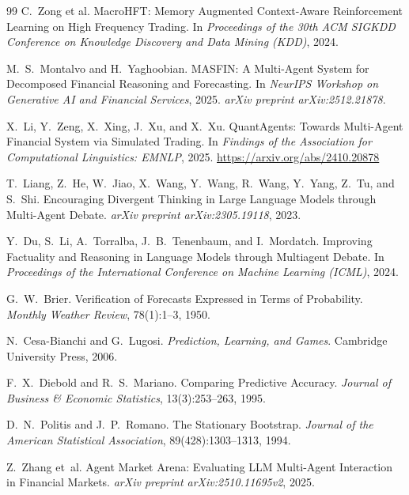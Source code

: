 \documentclass[10pt,a4paper,twocolumn]{article}
\begin{document}
\begin{thebibliography}{99}
C.~Zong et al.
\newblock MacroHFT: Memory Augmented Context-Aware Reinforcement Learning on High Frequency Trading.
\newblock In \emph{Proceedings of the 30th ACM SIGKDD Conference on Knowledge Discovery and Data Mining (KDD)}, 2024.

M.~S.~Montalvo and H.~Yaghoobian.
\newblock MASFIN: A Multi-Agent System for Decomposed Financial Reasoning and Forecasting.
\newblock In \emph{NeurIPS Workshop on Generative AI and Financial Services}, 2025. \emph{arXiv preprint arXiv:2512.21878}.

X.~Li, Y.~Zeng, X.~Xing, J.~Xu, and X.~Xu.
\newblock QuantAgents: Towards Multi-Agent Financial System via Simulated Trading.
\newblock In \emph{Findings of the Association for Computational Linguistics: EMNLP}, 2025. \url{https://arxiv.org/abs/2410.20878}

T.~Liang, Z.~He, W.~Jiao, X.~Wang, Y.~Wang, R.~Wang, Y.~Yang, Z.~Tu, and S.~Shi.
\newblock Encouraging Divergent Thinking in Large Language Models through Multi-Agent Debate.
\newblock \emph{arXiv preprint arXiv:2305.19118}, 2023.

Y.~Du, S.~Li, A.~Torralba, J.~B.~Tenenbaum, and I.~Mordatch.
\newblock Improving Factuality and Reasoning in Language Models through Multiagent Debate.
\newblock In \emph{Proceedings of the International Conference on Machine Learning (ICML)}, 2024.

G.~W.~Brier.
\newblock Verification of Forecasts Expressed in Terms of Probability.
\newblock \emph{Monthly Weather Review}, 78(1):1--3, 1950.

N.~Cesa-Bianchi and G.~Lugosi.
\newblock \emph{Prediction, Learning, and Games}.
\newblock Cambridge University Press, 2006.

F.~X.~Diebold and R.~S.~Mariano.
\newblock Comparing Predictive Accuracy.
\newblock \emph{Journal of Business \& Economic Statistics}, 13(3):253--263, 1995.

D.~N.~Politis and J.~P.~Romano.
\newblock The Stationary Bootstrap.
\newblock \emph{Journal of the American Statistical Association}, 89(428):1303--1313, 1994.

Z.~Zhang et~al.
\newblock Agent Market Arena: Evaluating LLM Multi-Agent Interaction in Financial Markets.
\newblock \emph{arXiv preprint arXiv:2510.11695v2}, 2025.

\end{thebibliography}
\end{document}
